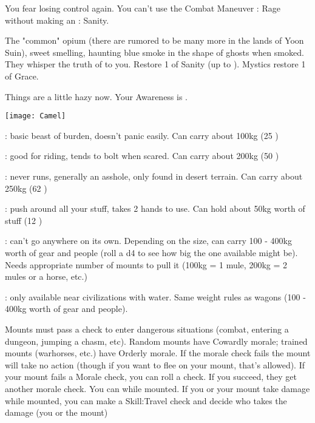 {\begin{multicols}{2}
    You fear losing control again.  You can't use the Combat Maneuver : Rage without making an \RS : Sanity.


  The "common" opium (there are rumored to be many more in the lands of Yoon Suin), sweet smelling, haunting blue smoke in the shape of ghosts when smoked.  They whisper the truth of \TheAuthority to you.  Restore 1 \UD of Sanity (up to \MAX).  Mystics restore 1 \UD of Grace.

    Things are a little hazy now.  Your \MAX Awareness is \DCDOWN.

  \newpage


 

  \begin{center}
  \texttt{[image: Camel]}
  \end{center}

   
  : basic beast of burden, doesn't panic easily.  Can carry about 100kg (25 )

  :   good for riding, tends to bolt when scared.  Can carry about 200kg (50 )

  :  never runs, generally an asshole, only found in desert terrain.  Can carry about 250kg (62 )

  :  push around all your stuff, takes 2 hands to use.  Can hold about 50kg worth of stuff (12 )

  :  can't go anywhere on its own.  Depending on the size, can carry 100 - 400kg worth of gear and people (roll a d4 to see how big the one available might be).  Needs appropriate number of mounts to pull it (100kg = 1 mule, 200kg = 2 mules or a horse, etc.)

  :  only available near civilizations with water.  Same weight rules as wagons (100 - 400kg worth of gear and people).

\cbreak      

    
    Mounts must pass a  check to enter dangerous situations (combat, entering a dungeon, jumping a chasm, etc). Random mounts have Cowardly morale; trained mounts (warhorses, etc.) have Orderly morale.  If the morale check fails the mount will take no action (though if you want to flee on your mount, that's allowed). If your mount fails a Morale check, you can roll a  check.  If you succeed, they get another morale check. You can  while mounted.  If you or your mount take damage while mounted, you can make a Skill:Travel check and decide who takes the damage (you or the mount)



\end{multicols}}
